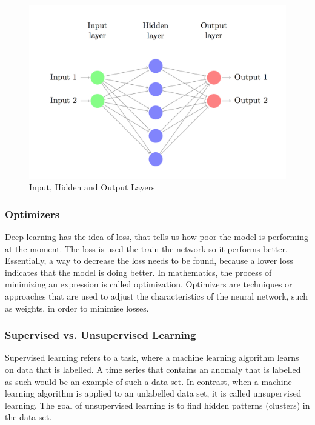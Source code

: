 \begin{figure}[h]
	\centering
	\includegraphics[scale=0.3]{Figures/layers}
	\decoRule
	\caption[Input, Hidden and Output Layers]{Input, Hidden and Output Layers \parencite{DennyBritz2015}}
	\label{fig:layers}
\end{figure}



\subsubsection{Optimizers} \label{optimizer}
Deep learning has the idea of loss, that tells us how poor the model is performing at the moment. The loss is used the train the network so it performs better. Essentially, a way to decrease the loss needs to be found, because a lower loss indicates that the model is doing better. In mathematics, the process of minimizing an expression is called optimization. Optimizers are techniques or approaches that are used to adjust the characteristics of the neural network, such as weights, in order to minimise losses.

\subsubsection{Supervised vs. Unsupervised Learning}
Supervised learning refers to a task, where a machine learning algorithm learns on data that is labelled. A time series that contains an anomaly that is labelled as such would be an example of such a data set. In contrast, when a machine learning algorithm is applied to an unlabelled data set, it is called unsupervised learning. The goal of unsupervised learning is to find hidden patterns (clusters) in the data set.


